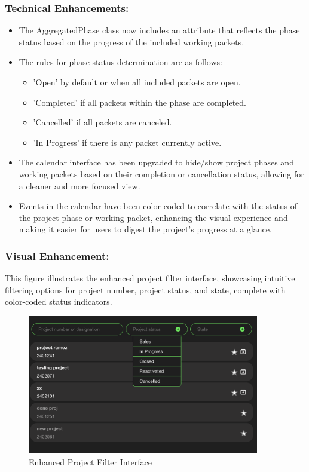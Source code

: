 \subsubsection*{Technical Enhancements:}
\begin{itemize}
    \item The AggregatedPhase class now includes an attribute that reflects the phase status based on the progress of the included working packets.
    \item The rules for phase status determination are as follows:
        \begin{itemize}
            \item 'Open' by default or when all included packets are open.
            \item 'Completed' if all packets within the phase are completed.
            \item 'Cancelled' if all packets are canceled.
            \item 'In Progress' if there is any packet currently active.
        \end{itemize}
    \item The calendar interface has been upgraded to hide/show project phases and working packets based on their completion or cancellation status, allowing for a cleaner and more focused view.
    \item Events in the calendar have been color-coded to correlate with the status of the project phase or working packet, enhancing the visual experience and making it easier for users to digest the project's progress at a glance.
\end{itemize}

\subsubsection*{Visual Enhancement:}
This figure illustrates the enhanced project filter interface, showcasing intuitive filtering options for project number, project status, and state, complete with color-coded status indicators.

\begin{figure}[H]
    \centering
    \includegraphics[width=0.9\textwidth]{src/assets/chapters/enhanced-project-filter-interface.png}
    \caption{ Enhanced Project Filter Interface}
    \label{fig:enhanced_project_filter_interface}
\end{figure}


